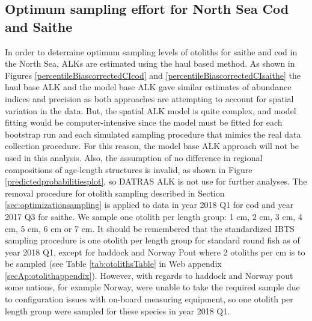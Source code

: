 \documentclass[a4paper 12pt]{article}
\numberwithin{equation}{section}
\begin{document}
\subsection{Optimum sampling effort for North Sea Cod and Saithe}
\label{sec:optimumeffortresults}
In order to determine optimum sampling levels of otoliths for saithe and cod in the North Sea, ALKs are estimated using the haul based  method. As shown in Figures \ref{percentileBiascorrectedCIcod} and \ref{percentileBiascorrectedCIsaithe} the haul base ALK and the model base ALK gave similar estimates of abundance indices and precision as both approaches are attempting to account for spatial variation in the data. But, the spatial ALK model is  quite complex, and model fitting would be computer-intensive since the model must be fitted for each bootstrap run and each simulated sampling procedure that mimics the real data collection procedure. For this reason, the model base ALK approach will not be used in this analysis. Also, the assumption of no difference in regional compositions of age-length structures is invalid,  as shown in Figure \ref{predictedprobabilitiesplot},  so DATRAS ALK is not use for further analyses. The removal procedure for otolith sampling described in Section \ref{sec:optimizationsampling} is applied to data in year 2018 Q1 for cod and year 2017 Q3 for saithe. We sample one otolith per length group: 1 cm, 2 cm, 3 cm, 4 cm, 5 cm, 6 cm or 7 cm. It should be remembered that the standardized IBTS sampling procedure is one otolith per length group for standard round fish as of year 2018 Q1, except for haddock and Norway Pout where 2 otoliths per cm is to be sampled (see Table \ref{tab:otolithsTable} in Web appendix \ref{secAp:otolithappendix}). However, with regards to haddock and Norway pout some nations, for example Norway, were unable to take the required sample due to configuration issues with on-board measuring equipment, so one otolith per length group were sampled for these species in year 2018 Q1.
\end{document}
